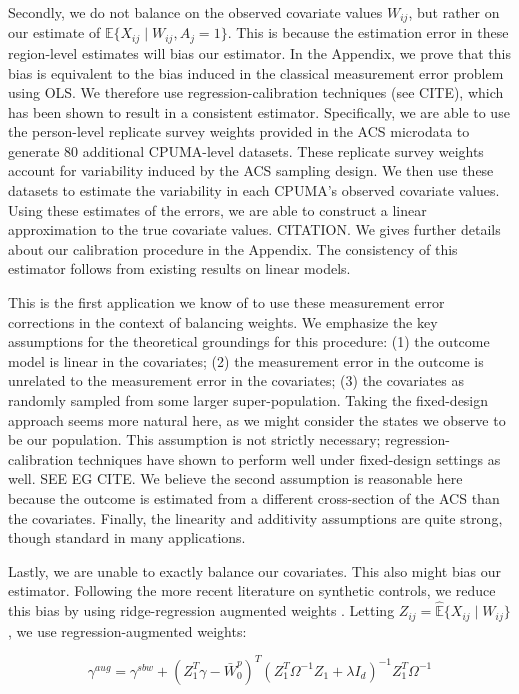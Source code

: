 \documentclass[12pt]{article}
\begin{document}
Secondly, we do not balance on the observed covariate values $W_{ij}$, but rather on our estimate of $\mathbb{E}\{X_{ij} \mid W_{ij}, A_j = 1\}$. This is because the estimation error in these region-level estimates will bias our estimator. In the Appendix, we prove that this bias is equivalent to the bias induced in the classical measurement error problem using OLS. We therefore use regression-calibration techniques (see CITE), which has been shown to result in a consistent estimator. Specifically, we are able to use the person-level replicate survey weights provided in the ACS microdata to generate 80 additional CPUMA-level datasets. These replicate survey weights account for variability induced by the ACS sampling design. We then use these datasets to estimate the variability in each CPUMA's observed covariate values. Using these estimates of the errors, we are able to construct a linear approximation to the true covariate values. CITATION. We gives further details about our calibration procedure in the Appendix. The consistency of this estimator follows from existing results on linear models. 

This is the first application we know of to use these measurement error corrections in the context of balancing weights. We emphasize the key assumptions for the theoretical groundings for this procedure: (1) the outcome model is linear in the covariates; (2) the measurement error in the outcome is unrelated to the measurement error in the covariates; (3) the covariates as randomly sampled from some larger super-population. Taking the fixed-design approach seems more natural here, as we might consider the states we observe to be our population. This assumption is not strictly necessary; regression-calibration techniques have shown to perform well under fixed-design settings as well. SEE EG CITE. We believe the second assumption is reasonable here because the outcome is estimated from a different cross-section of the ACS than the covariates. Finally, the linearity and additivity assumptions are quite strong, though standard in many applications.

Lastly, we are unable to exactly balance our covariates. This also might bias our estimator. Following the more recent literature on synthetic controls, we reduce this bias by using ridge-regression augmented weights \cite{ben2018augmented}. Letting $Z_{ij} = \hat{\mathbb{E}}\{X_{ij} \mid W_{ij}\}$, we use regression-augmented weights:

$$
\gamma^{aug} = \gamma^{sbw} + (Z_1^T\gamma - \bar{W}_0^p)^T(Z_1^T\Omega^{-1}Z_1 + \lambda I_d)^{-1}Z_1^T\Omega^{-1}
$$
\end{document}
